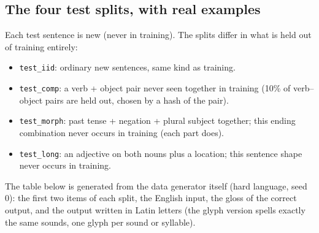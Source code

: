 \documentclass[10pt,a4paper,oneside]{article}
\begin{document}
\subsection{The four test splits, with real examples}

Each test sentence is new (never in training). The splits differ in what is held out of training entirely:
\begin{itemize}
\item \texttt{test\_iid}: ordinary new sentences, same kind as training.
\item \texttt{test\_comp}: a verb + object pair never seen together in training (10\% of verb--object pairs are
held out, chosen by a hash of the pair).
\item \texttt{test\_morph}: past tense + negation + plural subject together; this ending combination never occurs in
training (each part does).
\item \texttt{test\_long}: an adjective on both nouns plus a location; this sentence shape never occurs in training.
\end{itemize}
The table below is generated from the data generator itself (hard language, seed 0): the first two items of each
split, the English input, the gloss of the correct output, and the output written in Latin letters (the glyph
version spells exactly the same sounds, one glyph per sound or syllable).
\end{document}

